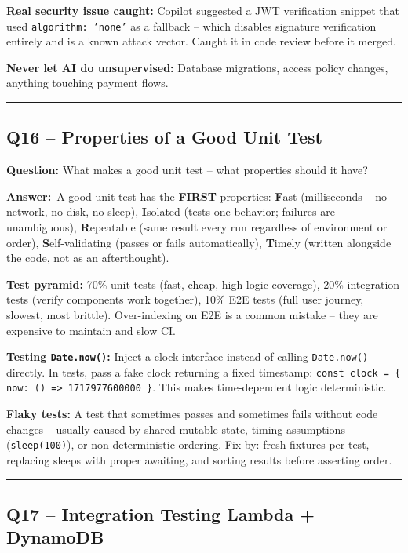 \documentclass[letterpaper,10pt]{article}
\newlength{\boxwidth}
\newcommand{\questionbox}[1]{%
  \vspace{6pt}%
  \noindent\colorbox{qbg}{%
    \begin{minipage}{\boxwidth}%
      \vspace{3pt}\textbf{\textcolor{nordblue}{Question:}} #1\vspace{3pt}%
    \end{minipage}%
  }\vspace{2pt}%
}
\newcommand{\answerlabel}{\noindent\textbf{\textcolor{answerblue}{Answer:}}~}
\begin{document}
\textbf{Real security issue caught:} Copilot suggested a JWT verification snippet that used \texttt{algorithm: 'none'} as a fallback -- which disables signature verification entirely and is a known attack vector. Caught it in code review before it merged.

\textbf{Never let AI do unsupervised:} Database migrations, access policy changes, anything touching payment flows.

\medskip\rule{\linewidth}{0.2pt}

\subsection*{Q16 -- Properties of a Good Unit Test}

\questionbox{What makes a good unit test -- what properties should it have?}

\answerlabel A good unit test has the \textbf{FIRST} properties: \textbf{F}ast (milliseconds -- no network, no disk, no sleep), \textbf{I}solated (tests one behavior; failures are unambiguous), \textbf{R}epeatable (same result every run regardless of environment or order), \textbf{S}elf-validating (passes or fails automatically), \textbf{T}imely (written alongside the code, not as an afterthought).

\textbf{Test pyramid:} 70\% unit tests (fast, cheap, high logic coverage), 20\% integration tests (verify components work together), 10\% E2E tests (full user journey, slowest, most brittle). Over-indexing on E2E is a common mistake -- they are expensive to maintain and slow CI.

\textbf{Testing \texttt{Date.now()}:} Inject a clock interface instead of calling \texttt{Date.now()} directly. In tests, pass a fake clock returning a fixed timestamp: \texttt{const clock = \{ now: () => 1717977600000 \}}. This makes time-dependent logic deterministic.

\textbf{Flaky tests:} A test that sometimes passes and sometimes fails without code changes -- usually caused by shared mutable state, timing assumptions (\texttt{sleep(100)}), or non-deterministic ordering. Fix by: fresh fixtures per test, replacing sleeps with proper awaiting, and sorting results before asserting order.

\medskip\rule{\linewidth}{0.2pt}

\subsection*{Q17 -- Integration Testing Lambda + DynamoDB}
\end{document}
